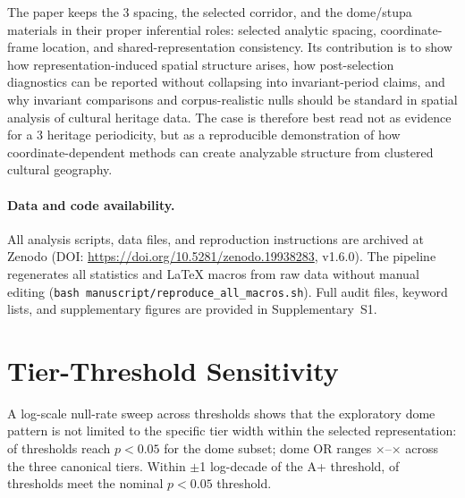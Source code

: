 \documentclass[12pt,a4paper]{article}
\begin{document}
The paper keeps the 3\textdegree{} spacing, the selected corridor, and the
dome/stupa materials in their proper inferential roles: selected analytic
spacing, coordinate-frame location, and shared-representation consistency. Its
contribution is to show how representation-induced spatial structure arises,
how post-selection diagnostics can be reported without collapsing into
invariant-period claims, and why invariant comparisons and corpus-realistic
nulls should be standard in spatial analysis of cultural heritage data.
The case is therefore best read not as evidence for a 3\textdegree{} heritage
periodicity, but as a reproducible demonstration of how coordinate-dependent
methods can create analyzable structure from clustered cultural geography.


\paragraph{Data and code availability.}
\label{sec:data_code}
All analysis scripts, data files, and reproduction instructions are archived
at Zenodo (DOI: \url{https://doi.org/10.5281/zenodo.19938283}, v1.6.0).
The pipeline regenerates all statistics and LaTeX macros from raw data
without manual editing (\texttt{bash manuscript/reproduce\_all\_macros.sh}).
Full audit files, keyword lists, and supplementary figures are provided in
Supplementary~S1.


\appendix

\section{Tier-Threshold Sensitivity}
\label{app:tier_sensitivity}

A log-scale null-rate sweep across \logSweepNtaus{} thresholds shows that
the exploratory dome pattern is not limited to the specific tier width within
the selected representation:
\logSweepNsig{} of \logSweepNtaus{} thresholds reach $p < 0.05$ for the
dome subset; dome OR ranges
\logSweepMinEnrichCanon{}$\times$--\logSweepMaxEnrichCanon{}$\times$ across
the three canonical tiers. Within $\pm$1 log-decade of the A+ threshold,
\logSweepAregionNsig{} of \logSweepAregionNtaus{} thresholds meet the
nominal $p < 0.05$ threshold.
\end{document}
